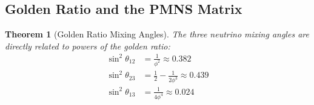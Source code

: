 \documentclass[12pt,a4paper]{article}
\newtheorem{theorem}{Theorem}[section]
\begin{document}
\subsection{Golden Ratio and the PMNS Matrix}
\label{subsec:pmns-matrix}

\begin{theorem}[Golden Ratio Mixing Angles]
\label{thm:mixing-angles}
The three neutrino mixing angles are directly related to powers of the golden ratio:
\begin{align}
\sin^2\theta_{12} &= \frac{1}{\phi^2} \approx 0.382 \\
\sin^2\theta_{23} &= \frac{1}{2} - \frac{1}{2\phi^3} \approx 0.439 \\
\sin^2\theta_{13} &= \frac{1}{4\phi^4} \approx 0.024
\end{align}
\end{theorem}
\end{document}
